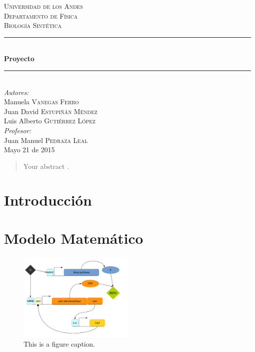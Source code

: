 \documentclass[12pt]{article}
\begin{document}
\begin{titlepage}

\newcommand{\HRule}{\rule{\linewidth}{0.5mm}}

\center

\textsc{\LARGE Universidad de los Andes}\\[1.5cm]
\textsc{\Large Departamento de F\'isica}\\[0.5cm]
\textsc{\large Biolog\'ia Sint\'etica}\\[0.5cm] 

\HRule \\[0.4cm]
{ \huge \bfseries Proyecto}\\[0.4cm]
\HRule \\[1.5cm]
 

\Large \emph{Autores:}\\
Manuela \textsc{Vanegas Ferro}\\
Juan David \textsc{Estupi\~n\'an M\'endez}\\
Luis Alberto \textsc{Guti\'errez L\'opez}\\[2cm]

\Large \emph{Profesor:}\\
Juan Manuel \textsc{Pedraza Leal}\\[3cm]


{\large Mayo 21 de 2015}\\[2cm]

\vfill

\end{titlepage}

\tableofcontents
\pagebreak

\begin{abstract}
  Your abstract\cite{kressler01} \cite{cleland67} \cite{turlings95} \cite{sallaud09} \cite {kirby09} \cite{harada09a} \cite{harada09b} \cite{crocker80} \cite{engerberg-kulka04} \cite {alon06}.
\end{abstract}

\section{Introducci\'on}


\section{Modelo Matem\'atico}
\label{sec:model}

\begin{figure}[H]
  \centering
  \includegraphics[width=0.5\textwidth]{circuit.png}
  \caption{\label{fig:Circuit}This is a figure caption.}
\end{figure}
\end{document}
